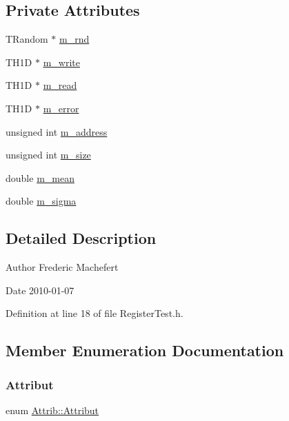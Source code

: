\subsection*{Private Attributes}
\begin{DoxyCompactItemize}
\item 
T\+Random $\ast$ \hyperlink{classRegisterTest_a07e35817b07d61e54caa694d2a0fa210}{m\+\_\+rnd}
\item 
T\+H1D $\ast$ \hyperlink{classRegisterTest_a4e2dbc640871ece43a554425e2b73dcf}{m\+\_\+write}
\item 
T\+H1D $\ast$ \hyperlink{classRegisterTest_a5bb74853c26fdf7223244c569c64eb6d}{m\+\_\+read}
\item 
T\+H1D $\ast$ \hyperlink{classRegisterTest_a9b32a49463a1b1d319fde007607254f0}{m\+\_\+error}
\item 
unsigned int \hyperlink{classRegisterTest_a1a227f5fe12e8cfc284a904bb9f7e109}{m\+\_\+address}
\item 
unsigned int \hyperlink{classRegisterTest_ab543b709d593b4ae36c628c60da76923}{m\+\_\+size}
\item 
double \hyperlink{classRegisterTest_aba5ac8088017236617d2244fc0c261b9}{m\+\_\+mean}
\item 
double \hyperlink{classRegisterTest_a17f1f3646bf00ae7ab6744afca9e6813}{m\+\_\+sigma}
\end{DoxyCompactItemize}


\subsection{Detailed Description}
\begin{DoxyAuthor}{Author}
Frederic Machefert 
\end{DoxyAuthor}
\begin{DoxyDate}{Date}
2010-\/01-\/07 
\end{DoxyDate}


Definition at line 18 of file Register\+Test.\+h.



\subsection{Member Enumeration Documentation}
\mbox{\label{classAttrib_a69e171d7cc6417835a5a306d3c764235}} 
\subsubsection{\texorpdfstring{Attribut}{Attribut}}
{\footnotesize\ttfamily enum \hyperlink{classAttrib_a69e171d7cc6417835a5a306d3c764235}{Attrib\+::\+Attribut}\hspace{0.3cm}{\ttfamily [inherited]}}

